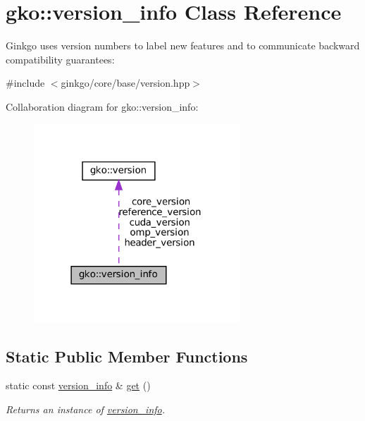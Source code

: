 \hypertarget{classgko_1_1version__info}{}\section{gko\+:\+:version\+\_\+info Class Reference}
\label{classgko_1_1version__info}


Ginkgo uses version numbers to label new features and to communicate backward compatibility guarantees\+:  




{\ttfamily \#include $<$ginkgo/core/base/version.\+hpp$>$}



Collaboration diagram for gko\+:\+:version\+\_\+info\+:
\nopagebreak
\begin{figure}[H]
\begin{center}
\leavevmode
\includegraphics[width=219pt]{classgko_1_1version__info__coll__graph}
\end{center}
\end{figure}
\subsection*{Static Public Member Functions}
\begin{DoxyCompactItemize}
\item 
static const \hyperlink{classgko_1_1version__info}{version\+\_\+info} \& \hyperlink{classgko_1_1version__info_a6daeb8a087cfb57fa055526fc133d8eb}{get} ()
\begin{DoxyCompactList}\small\item\em Returns an instance of \hyperlink{classgko_1_1version__info}{version\+\_\+info}. \end{DoxyCompactList}\end{DoxyCompactItemize}
